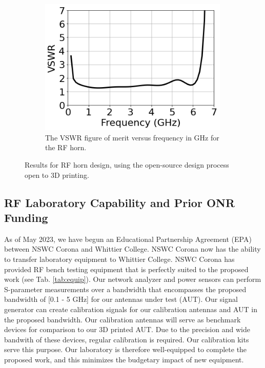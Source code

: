 \documentclass[../../main.tex]{subfiles}
\begin{document}
\begin{figure}
\begin{subfigure}{0.65\textwidth}
\end{subfigure}
\hfill
\begin{subfigure}{0.3\textwidth}
    \includegraphics[width=0.99\textwidth]{figures/vswr.png}
	\caption{The VSWR figure of merit versus frequency in GHz for the RF horn.}
\end{subfigure}
\caption{Results for RF horn design, using the open-source design process open to 3D printing.}
\label{fig:3d_cad}
\end{figure}

\subsection{RF Laboratory Capability and Prior ONR Funding}

As of May 2023, we have begun an Educational Partnership Agreement (EPA) between NSWC Corona and Whittier College.  NSWC Corona now has the ability to transfer laboratory equipment to Whittier College.  NSWC Corona has provided RF bench testing equipment that is perfectly suited to the proposed work (see Tab. \ref{tab:equip}).  Our network analyzer and power sensors can perform S-parameter measurements over a bandwidth that encompasses the proposed bandwidth of [0.1 - 5 GHz] for our antennas under test (AUT).  Our signal generator can create calibration signals for our calibration antennas and AUT in the proposed bandwidth.  Our calibration antennas will serve as benchmark devices for comparison to our 3D printed AUT.  Due to the precision and wide bandwith of these devices, regular calibration is required.  Our calibration kits serve this purpose.  Our laboratory is therefore well-equipped to complete the proposed work, and this minimizes the budgetary impact of new equipment. \\ \vspace{2.5mm}
\end{document}
